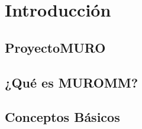 
\chapter{Introducción}

    \section{ProyectoMURO}

    \section{¿Qué es MUROMM?}

    \section{Conceptos Básicos}